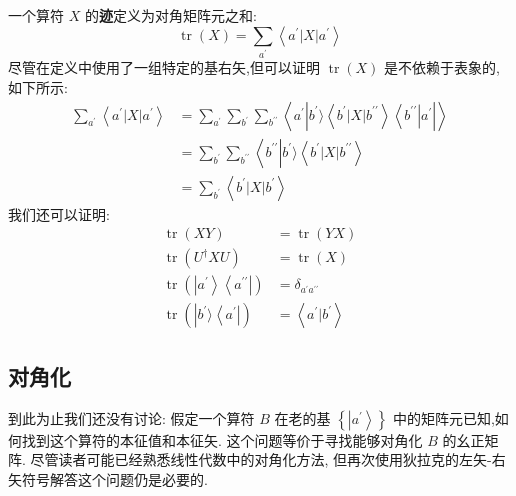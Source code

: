 	一个算符 $X$ 的\textbf{迹}定义为对角矩阵元之和:
	\begin{equation}
		\operatorname{tr}\left( X\right) = \mathop{\sum }\limits_{{a}^{\prime }}\left\langle {{a}^{\prime }\left| X\right| {a}^{\prime }}\right\rangle
	\end{equation}
	尽管在定义中使用了一组特定的基右矢,但可以证明 $\operatorname{tr}\left( X\right)$ 是不依赖于表象的,如下所示:
	\begin{equation}
		\begin{aligned}
			\mathop{\sum }\limits_{{a}^{\prime }}\left\langle {{a}^{\prime }\left| X\right| {a}^{\prime }}\right\rangle &= \mathop{\sum }\limits_{{a}^{\prime }}\mathop{\sum }\limits_{{b}^{\prime }}\mathop{\sum }\limits_{{b}^{\prime\prime }}\left\langle {{a}^{\prime }\left| {{b}^{\prime }\rangle \left\langle {{b}^{\prime }\left| X\right| {b}^{\prime \prime }}\right\rangle \left\langle {b}^{\prime \prime }\right| {a}^{\prime }}\right| }\right\rangle\\
			&= \mathop{\sum }\limits_{{b}^{\prime }}\mathop{\sum }\limits_{{b}^{\prime \prime }}\left\langle {b}^{\prime \prime }\left| {b}^{\prime }\rangle \left\langle {{b}^{\prime }\left| X\right| {b}^{\prime \prime }}\right\rangle \\
			&= \mathop{\sum }\limits_{{b}^{\prime }}\left\langle {{b}^{\prime }\left| X\right| {b}^{\prime }}\right\rangle
		\end{aligned}
	\end{equation}
	我们还可以证明:
	\begin{equation}
		\begin{aligned}
			\operatorname{tr}\left( {XY}\right) &= \operatorname{tr}\left( {YX}\right)\\
			\operatorname{tr}\left( {{U}^{ \dagger }{XU}}\right) &= \operatorname{tr}\left( X\right)\\
			\operatorname{tr}\left( {\left| {a}^{\prime }\right\rangle \left\langle {a}^{\prime \prime }\right| }\right) &= {\delta }_{{a}^{\prime }{a}^{\prime \prime }}\\
			\operatorname{tr}\left( \left| {{b}^{\prime }\rangle \left\langle {a}^{\prime }\right| } \right) &= \left\langle {{a}^{\prime } | {b}^{\prime }}\right\rangle
		\end{aligned}
	\end{equation}
	\subsection{对角化}
	到此为止我们还没有讨论: 假定一个算符 $B$ 在老的基 $\left\{ \left| {a}^{\prime }\right\rangle \right\}$ 中的矩阵元已知,如何找到这个算符的本征值和本征矢. 这个问题等价于寻找能够对角化 $B$ 的幺正矩阵. 尽管读者可能已经熟悉线性代数中的对角化方法, 但再次使用狄拉克的左矢-右矢符号解答这个问题仍是必要的.
	
